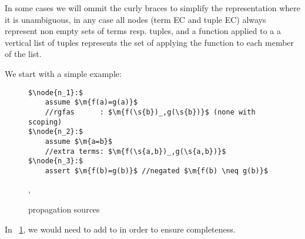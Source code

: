 In some cases we will ommit the curly braces to simplify the representation where it is unambiguous, 
in any case all nodes (term EC and tuple EC) always represent non empty sets of terms resp. tuples, 
and a function applied to a a vertical list of tuples represents the set of applying the function to each member of the list.

\noindent
We start with a simple example:
\begin{figure}[H]
\begin{lstlisting}
$\node{n_1}:$
	assume $\m{f(a)=g(a)}$
	//rgfas      : $\m{f(\s{b})_,g(\s{b})}$ (none with scoping)
$\node{n_2}:$
	assume $\m{a=b}$
	//extra terms: $\m{f(\s{a,b})_,g(\s{a,b})}$
$\node{n_3}:$
	assert $\m{f(b)=g(b)}$ //negated $\m{f(b) \neq g(b)}$
\end{lstlisting}
\caption{propagation sources},
\label{snippet3.16a}
\end{figure}

In ~\ref{snippet3.16a}, we would need to add  to  in order to ensure completeness.

